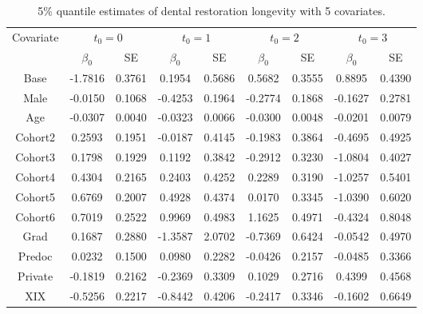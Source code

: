 \documentclass[titlepage,english,12pt]{article}
\begin{document}
	\begin{table}[H] \label{table:9}
		\caption{5\% quantile estimates of dental restoration longevity with 5 covariates.}
		\centering
		\begin{tabular}{|c|c|c|c|c|c|c|c|c|}
			\hline
			\multirow{2}{*}{Covariate} & \multicolumn{2}{c|}{$t_0=0$} & \multicolumn{2}{c|}{$t_0=1$} & \multicolumn{2}{c|}{$t_0=2$} & \multicolumn{2}{c|}{$t_0=3$}\\ 
			\cline{2-9}
			& $\beta_0$ & SE & $\beta_0$ & SE  & $\beta_0$ & SE & $\beta_0$ & SE\\
			\hline\hline
			Base & -1.7816 & 0.3761 & 0.1954 & 0.5686 & 0.5682 & 0.3555 & 0.8895 & 0.4390 \\ 
			Male & -0.0150 & 0.1068 & -0.4253 & 0.1964 & -0.2774 & 0.1868 & -0.1627 & 0.2781 \\ 
			Age & -0.0307 & 0.0040 & -0.0323 & 0.0066 & -0.0300 & 0.0048 & -0.0201 & 0.0079 \\ 
			Cohort2 & 0.2593 & 0.1951 & -0.0187 & 0.4145 & -0.1983 & 0.3864 & -0.4695 & 0.4925 \\ 
			Cohort3 & 0.1798 & 0.1929 & 0.1192 & 0.3842 & -0.2912 & 0.3230 & -1.0804 & 0.4027 \\ 
			Cohort4 & 0.4304 & 0.2165 & 0.2403 & 0.4252 & 0.2289 & 0.3190 & -1.0257 & 0.5401 \\ 
			Cohort5 & 0.6769 & 0.2007 & 0.4928 & 0.4374 & 0.0170 & 0.3345 & -1.0390 & 0.6020 \\ 
			Cohort6 & 0.7019 & 0.2522 & 0.9969 & 0.4983 & 1.1625 & 0.4971 & -0.4324 & 0.8048 \\ 
			Grad & 0.1687 & 0.2880 & -1.3587 & 2.0702 & -0.7369 & 0.6424 & -0.0542 & 0.4970 \\ 
			Predoc & 0.0232 & 0.1500 & 0.0980 & 0.2282 & -0.0426 & 0.2157 & -0.0485 & 0.3366 \\ 
			Private & -0.1819 & 0.2162 & -0.2369 & 0.3309 & 0.1029 & 0.2716 & 0.4399 & 0.4568 \\ 
			XIX & -0.5256 & 0.2217 & -0.8442 & 0.4206 & -0.2417 & 0.3346 & -0.1602 & 0.6649 \\ 
			\hline
		\end{tabular}
	\end{table}
\end{document}
